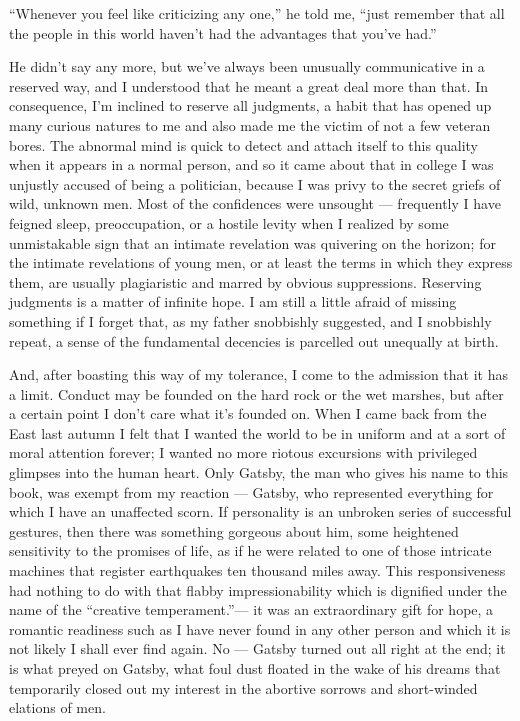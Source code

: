\documentclass{znotebook}
\begin{document}
``Whenever you feel like criticizing any one,'' he told me, ``just remember that all the people in this world haven't had the advantages that you've had.''

He didn't say any more, but we've always been unusually communicative in a reserved way, and I understood that he meant a great deal more than that. In consequence, I'm inclined to reserve all judgments, a habit that has opened up many curious natures to me and also made me the victim of not a few veteran bores. The abnormal mind is quick to detect and attach itself to this quality when it appears in a normal person, and so it came about that in college I was unjustly accused of being a politician, because I was privy to the secret griefs of wild, unknown men. Most of the confidences were unsought — frequently I have feigned sleep, preoccupation, or a hostile levity when I realized by some unmistakable sign that an intimate revelation was quivering on the horizon; for the intimate revelations of young men, or at least the terms in which they express them, are usually plagiaristic and marred by obvious suppressions. Reserving judgments is a matter of infinite hope. I am still a little afraid of missing something if I forget that, as my father snobbishly suggested, and I snobbishly repeat, a sense of the fundamental decencies is parcelled out unequally at birth.

And, after boasting this way of my tolerance, I come to the admission that it has a limit. Conduct may be founded on the hard rock or the wet marshes, but after a certain point I don't care what it's founded on. When I came back from the East last autumn I felt that I wanted the world to be in uniform and at a sort of moral attention forever; I wanted no more riotous excursions with privileged glimpses into the human heart. Only Gatsby, the man who gives his name to this book, was exempt from my reaction — Gatsby, who represented everything for which I have an unaffected scorn. If personality is an unbroken series of successful gestures, then there was something gorgeous about him, some heightened sensitivity to the promises of life, as if he were related to one of those intricate machines that register earthquakes ten thousand miles away. This responsiveness had nothing to do with that flabby impressionability which is dignified under the name of the ``creative temperament.''— it was an extraordinary gift for hope, a romantic readiness such as I have never found in any other person and which it is not likely I shall ever find again. No — Gatsby turned out all right at the end; it is what preyed on Gatsby, what foul dust floated in the wake of his dreams that temporarily closed out my interest in the abortive sorrows and short-winded elations of men.
\end{document}
